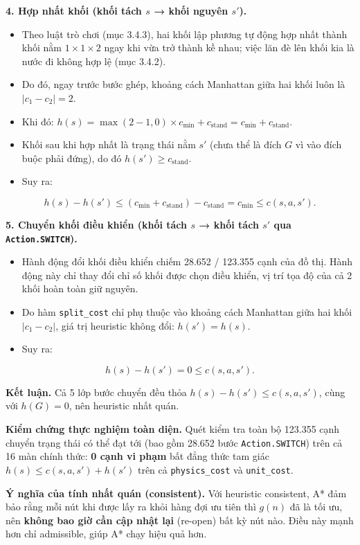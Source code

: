 \textbf{4. Hợp nhất khối (khối tách $s$ → khối nguyên $s'$).}

\begin{itemize}
\item Theo luật trò chơi (mục 3.4.3), hai khối lập phương tự động hợp nhất thành khối nằm $1\times 1\times 2$ ngay khi vừa trở thành kề nhau; việc lăn đè lên khối kia là nước đi không hợp lệ (mục 3.4.2).
\item Do đó, ngay trước bước ghép, khoảng cách Manhattan giữa hai khối luôn là $|c_1 - c_2| = 2$.
\item Khi đó: $h(s) = \max(2 - 1, 0) \times c_{\min} + c_{\text{stand}} = c_{\min} + c_{\text{stand}}$.
\item Khối sau khi hợp nhất là trạng thái nằm $s'$ (chưa thể là đích $G$ vì vào đích buộc phải đứng), do đó $h(s') \ge c_{\text{stand}}$.
\item Suy ra:
\end{itemize}

\[h(s) - h(s') \le (c_{\min} + c_{\text{stand}}) - c_{\text{stand}} = c_{\min} \le c(s, a, s').\]

\textbf{5. Chuyển khối điều khiển (khối tách $s$ → khối tách $s'$ qua \texttt{Action.SWITCH}).}

\begin{itemize}
\item Hành động đổi khối điều khiển chiếm 28.652 / 123.355 cạnh của đồ thị. Hành động này chỉ thay đổi chỉ số khối được chọn điều khiển, vị trí tọa độ của cả 2 khối hoàn toàn giữ nguyên.
\item Do hàm \texttt{split\_\allowbreak{}cost} chỉ phụ thuộc vào khoảng cách Manhattan giữa hai khối $|c_1 - c_2|$, giá trị heuristic không đổi: $h(s') = h(s)$.
\item Suy ra:
\end{itemize}

\[h(s) - h(s') = 0 \le c(s, a, s').\]

\textbf{Kết luận.} Cả 5 lớp bước chuyển đều thỏa $h(s) - h(s') \le c(s, a, s')$, cùng với $h(G) = 0$, nên heuristic nhất quán.

\textbf{Kiểm chứng thực nghiệm toàn diện.} Quét kiểm tra toàn bộ 123.355 cạnh chuyển trạng thái có thể đạt tới (bao gồm 28.652 bước \texttt{Action.SWITCH}) trên cả 16 màn chính thức: \textbf{0 cạnh vi phạm} bất đẳng thức tam giác $h(s) \le c(s, a, s') + h(s')$ trên cả \texttt{physics\_\allowbreak{}cost} và \texttt{unit\_\allowbreak{}cost}.

\begin{mdframed}[linecolor=blue!50!black, backgroundcolor=blue!3]
\textbf{Ý nghĩa của tính nhất quán (consistent).} Với heuristic consistent, A* đảm bảo rằng mỗi nút khi được lấy ra khỏi hàng đợi ưu tiên thì $g(n)$ đã là tối ưu, nên \textbf{không bao giờ cần cập nhật lại} (re-open) bất kỳ nút nào. Điều này mạnh hơn chỉ admissible, giúp A* chạy hiệu quả hơn.
\end{mdframed}
